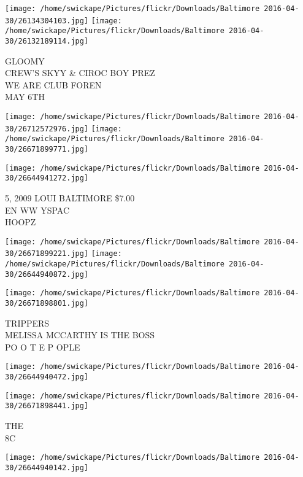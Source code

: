 \documentclass[10pt,letterpaper]{article}
\begin{document}
\texttt{[image: /home/swickape/Pictures/flickr/Downloads/Baltimore 2016-04-30/26134304103.jpg]}
\texttt{[image: /home/swickape/Pictures/flickr/Downloads/Baltimore 2016-04-30/26132189114.jpg]}

GLOOMY\\
CREW'S SKYY \& CIROC BOY PREZ\\
WE ARE CLUB FOREN\\
MAY 6TH\\
\pagebreak

\texttt{[image: /home/swickape/Pictures/flickr/Downloads/Baltimore 2016-04-30/26712572976.jpg]}
\texttt{[image: /home/swickape/Pictures/flickr/Downloads/Baltimore 2016-04-30/26671899771.jpg]}

\vspace{0.25in}
\texttt{[image: /home/swickape/Pictures/flickr/Downloads/Baltimore 2016-04-30/26644941272.jpg]}

5, 2009 LOUI BALTIMORE \$7.00\\
EN WW YSPAC\\
HOOPZ\\
\pagebreak

\texttt{[image: /home/swickape/Pictures/flickr/Downloads/Baltimore 2016-04-30/26671899221.jpg]}
\texttt{[image: /home/swickape/Pictures/flickr/Downloads/Baltimore 2016-04-30/26644940872.jpg]}

\vspace{0.25in}
\texttt{[image: /home/swickape/Pictures/flickr/Downloads/Baltimore 2016-04-30/26671898801.jpg]}

TRIPPERS\\
MELISSA MCCARTHY IS THE BOSS\\
PO O T E P OPLE\\
\pagebreak

\texttt{[image: /home/swickape/Pictures/flickr/Downloads/Baltimore 2016-04-30/26644940472.jpg]}

\vspace{0.25in}
\texttt{[image: /home/swickape/Pictures/flickr/Downloads/Baltimore 2016-04-30/26671898441.jpg]}

THE\\
8C\\
\pagebreak

\texttt{[image: /home/swickape/Pictures/flickr/Downloads/Baltimore 2016-04-30/26644940142.jpg]}
\end{document}
